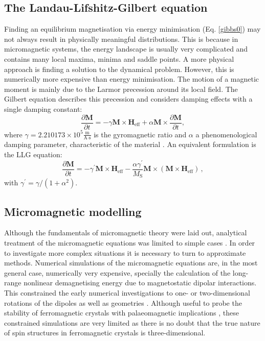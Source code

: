 \subsection{The Landau-Lifshitz-Gilbert equation}
Finding an equilibrium magnetisation via energy minimisation (Eq. \ref{gibbs0}) may not always result in physically meaningful distributions. This is because in micromagnetic systems, the energy landscape is usually very complicated and contains many local maxima, minima and saddle points. A more physical approach is finding a solution to the dynamical problem. However, this is numerically more expensive than energy minimisation. The motion of a magnetic moment is mainly due to the Larmor precession around its local field. The Gilbert equation \citep{Gilbert2004} describes this precession and considers damping effects with a single damping constant:
\begin{equation}
\frac{\partial \boldsymbol{M}}{\partial t} = -\gamma\boldsymbol{M}\times\boldsymbol{H}_\text{eff} + \alpha\boldsymbol{M}\times\frac{\partial\boldsymbol{M}}{\partial t},
\end{equation}
where $\gamma = 2.210173 \times 10^5 \frac{\text{m}}{\text{A}\cdot\text{s}}$ is the gyromagnetic ratio and $\alpha$ a phenomenological damping parameter, characteristic of the material \citep{Gilbert2004}. An equivalent formulation is the LLG equation:
\begin{equation}
\frac{\partial\boldsymbol{M}}{\partial t} = -\gamma^{'} \boldsymbol{M}\times\boldsymbol{H}_\text{eff} - \frac{\alpha\gamma^{'}}{M_\text{S}} \boldsymbol{M}\times(\boldsymbol{M}\times\boldsymbol{H}_\text{eff}) \, ,
\end{equation}
with $\gamma^{'} = \gamma / (1+\alpha^2)$.

\subsection{Micromagnetic modelling}
Although the fundamentals of micromagnetic theory were laid out, analytical treatment of the micromagnetic equations was limited to simple cases \citep{Landau1935,Brown1940,Kittel1949}. In order to investigate more complex situations it is necessary to turn to approximate methods. Numerical simulations of the micromagnetic equations are, in the most general case, numerically very expensive, specially the calculation of the long-range nonlinear demagnetising energy due to magnetostatic dipolar interactions. This constrained the early numerical investigations to one- or two-dimensional rotations of the dipoles as well as geometries \citep{Brown1965,Labonte1969,Stapper1969,Aharoni1986,Fredkin1987,Zhu1988}. Although useful to probe the stability of ferromagnetic crystals with palaeomagnetic implications \citep{Moskowitz1979,Moon1984,Enkin1987}, these constrained simulations are very limited as there is no doubt that the true nature of spin structures in ferromagnetic crystals is three-dimensional.\par

